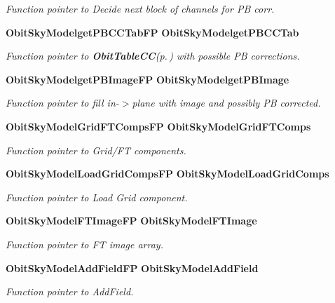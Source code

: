 \begin{CompactItemize}
\begin{CompactList}\small\item\em Function pointer to Decide next block of channels for PB corr. \item\end{CompactList}\item 
{\bf Obit\-Sky\-Modelget\-PBCCTab\-FP} {\bf Obit\-Sky\-Modelget\-PBCCTab}
\begin{CompactList}\small\item\em Function pointer to {\bf Obit\-Table\-CC}{\rm (p.\,\pageref{structObitTableCC})} with possible PB corrections. \item\end{CompactList}\item 
{\bf Obit\-Sky\-Modelget\-PBImage\-FP} {\bf Obit\-Sky\-Modelget\-PBImage}
\begin{CompactList}\small\item\em Function pointer to fill in-$>$plane with image and possibly PB corrected. \item\end{CompactList}\item 
{\bf Obit\-Sky\-Model\-Grid\-FTComps\-FP} {\bf Obit\-Sky\-Model\-Grid\-FTComps}
\begin{CompactList}\small\item\em Function pointer to Grid/FT components. \item\end{CompactList}\item 
{\bf Obit\-Sky\-Model\-Load\-Grid\-Comps\-FP} {\bf Obit\-Sky\-Model\-Load\-Grid\-Comps}
\begin{CompactList}\small\item\em Function pointer to Load Grid component. \item\end{CompactList}\item 
{\bf Obit\-Sky\-Model\-FTImage\-FP} {\bf Obit\-Sky\-Model\-FTImage}
\begin{CompactList}\small\item\em Function pointer to FT image array. \item\end{CompactList}\item 
{\bf Obit\-Sky\-Model\-Add\-Field\-FP} {\bf Obit\-Sky\-Model\-Add\-Field}
\begin{CompactList}\small\item\em Function pointer to Add\-Field. \item\end{CompactList}\item 

\end{CompactItemize}
